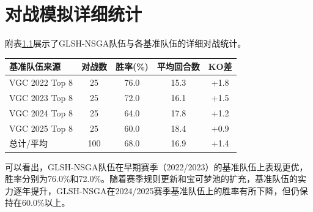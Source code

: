 \chapter{对战模拟详细统计}\label{app:battle-detail}

附表\ref{tab:battle-detail}展示了GLSH-NSGA队伍与各基准队伍的详细对战统计。

\begin{table}[!htbp]
    \label{tab:battle-detail}
    \centering
    \footnotesize
    \begin{tabular}{lcccc}
        \hline
        基准队伍来源 & 对战数 & 胜率(\%) & 平均回合数 & KO差 \\
        \hline
        VGC 2022 Top 8 & 25 & 76.0 & 15.3 & +1.8 \\
        VGC 2023 Top 8 & 25 & 72.0 & 16.1 & +1.5 \\
        VGC 2024 Top 8 & 25 & 64.0 & 17.8 & +1.2 \\
        VGC 2025 Top 8 & 25 & 60.0 & 18.4 & +0.9 \\
        \hline
        总计/平均 & 100 & 68.0 & 16.9 & +1.4 \\
        \hline
    \end{tabular}
\end{table}

可以看出，GLSH-NSGA队伍在早期赛季（2022/2023）的基准队伍上表现更优，胜率分别为76.0\%和72.0\%。随着赛季规则更新和宝可梦池的扩充，基准队伍的实力逐年提升，GLSH-NSGA在2024/2025赛季基准队伍上的胜率有所下降，但仍保持在60.0\%以上。
